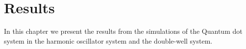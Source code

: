 \chapter{Results \label{chapter:7}}
    In this chapter we present the results from the simulations of the Quantum
    dot system in the harmonic oscillator system and the double-well system.
